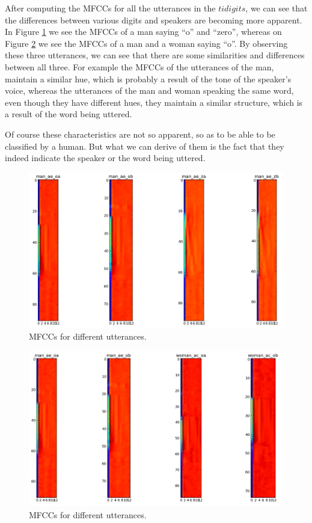 \documentclass[12pt,a4paper,oneside]{article}
\begin{document}
After computing the MFCCs for all the utterances in the $tidigits$, we can see that the differences between various digits and speakers are becoming more apparent. In Figure \ref{fig:mfccs} we see the MFCCs of a man saying ``o'' and ``zero'', whereas on Figure \ref{fig:mfccs1} we see the MFCCs of a man and a woman saying ``o''. By observing these three utterances, we can see that there are some similarities and differences between all three. For example the MFCCs of the utterances of the man, maintain a similar hue, which is probably a result of the tone of the speaker's voice, whereas the utterances of the man and woman speaking the same word, even though they have different hues, they maintain a similar structure, which is a result of the word being uttered.

Of course these characteristics are not so apparent, so as to be able to be classified by a human. But what we can derive of them is the fact that they indeed indicate the speaker or the word being uttered.

\begin{figure}
\centering
\includegraphics[scale=0.4]{../mfccs.png}
\caption{MFCCs for different utterances.}
\label{fig:mfccs}
\end{figure}

\begin{figure}
\centering
\includegraphics[scale=0.4]{../mfccs1.png}
\caption{MFCCs for different utterances.}
\label{fig:mfccs1}
\end{figure}
\end{document}
